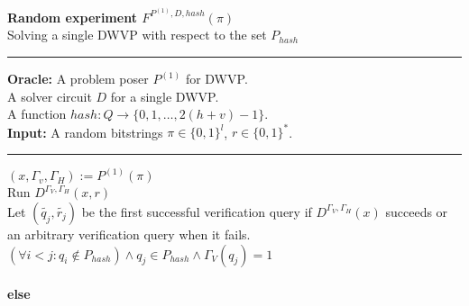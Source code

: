%
\begin{codeblock}
  \textbf{Random experiment $F^{P^{(1)}, D, hash}(\pi)$} \\
  Solving a single DWVP with respect to the set $P_{hash}$
  \medskip

  \hrule

  \medskip

  \textbf{Oracle:}
  A problem poser $P^{(1)}$ for DWVP. \\
  \IndI A solver circuit $D$ for a single DWVP. \\
  \IndI A function $hash: Q \rightarrow \{0,1,\dots, 2(h+v)-1\}$. \\
  \textbf{Input:} A random bitstrings $\pi \in \{0,1\}^l$, $r \in \{0,1\}^{*}$.
  \medskip\hrule\medskip

  $(x, \Gamma_v, \Gamma_H) := P^{(1)}(\pi)$ \\
  Run $D^{\Gamma_V, \Gamma_H}(x,r)$ \\
  \IndI Let $(\widetilde{q_j},\widetilde{r_j})$ be the first successful verification query if $D^{\Gamma_V, \Gamma_H}(x)$ succeeds or \\
  \IndI an arbitrary verification query when it fails. \\
  \If $(\forall i < j :  q_i \notin  P_{hash} ) \land q_j \in P_{hash} \land \Gamma_V(q_j) = 1$ \then \\
  \IndI {} \\
  \textbf{else}\\
  \IndI {}
\end{codeblock}
